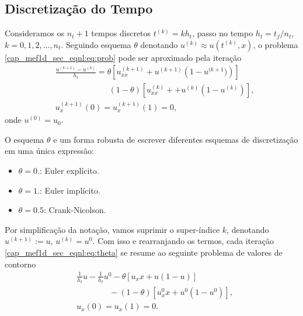 \subsection{Discretização do Tempo}

Consideramos os $n_t+1$ tempos discretos $t^{(k)} = k h_t$, passo no tempo $h_t = t_f/n_t$, $k = 0, 1, 2, \dotsc, n_t$. Seguindo esquema $\theta$ denotando $u^{(k)} \approx u\left(t^{(k)}, x\right)$, o problema \eqref{cap_mef1d_sec_eqnl:eq:prob} pode ser aproximado pela iteração
\begin{subequations}\label{cap_mef1d_sec_eqnl:eq:theta}
  \begin{align}
    &\frac{u^{(k+1)} - u^{(k)}}{h_t} = \theta \left[u^{(k+1)}_{xx} + u^{(k+1)}\left(1-u^{(k+1})\right)\right]\nonumber\\
    &\qquad\qquad\qquad\;\; (1-\theta) \left[u^{(k)}_{xx} + + u^{(k)}\left(1-u^{(k)}\right)\right],\\
    &u_x^{(k+1)}(0) = u_x^{(k+1)}(1) = 0,
  \end{align}
\end{subequations}
onde $u^{(0)} = u_0$. 

\begin{obs}
  O esquema $\theta$ e um forma robusta de escrever diferentes esquemas de discretização em uma única expressão:
  \begin{itemize}
    \item $\theta = 0.$: Euler explícito.
    \item $\theta = 1.$: Euler implícito.
    \item $\theta = 0.5$: Crank-Nicolson.
  \end{itemize}
\end{obs}

Por simplificação da notação, vamos suprimir o super-índice $k$, denotando $u^{(k+1)} := u$, $u^{(k)} = u^0$. Com isso e rearranjando os termos, cada iteração \eqref{cap_mef1d_sec_eqnl:eq:theta} se resume ao seguinte problema de valores de contorno
\begin{subequations}\label{cap_mef1d_sec_eqnl:eq:theta-iter}
  \begin{align}
    &\frac{1}{h_t}u - \frac{1}{h_t}u^0 - \theta\left[u_xx + u(1-u)\right]\nonumber\\
    &\qquad\qquad - (1-\theta)\left[u^0_xx + u^0(1-u^0)\right],\\
    &u_x(0) = u_x(1) = 0.
  \end{align}
\end{subequations}

